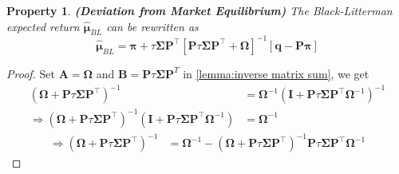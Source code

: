 \documentclass[13pt]{article}
\newtheorem{property}[theorem]{Property}
\theoremstyle{definition}
\theoremstyle{remark}
\begin{document}
\begin{property}\textbf{(Deviation from Market Equilibrium)}
    The Black-Litterman expected return $\bm{\hat{\bm{\mu}}}_{BL}$ can be rewritten as 
    \[
    \bm{\hat{\bm{\mu}}}_{BL}=\bm{\pi}+\tau \mathbf{\Sigma} \mathbf{P}^\top\left[\mathbf{P} \tau \mathbf{\Sigma} \mathbf{P}^\top+\mathbf{\Omega}\right]^{-1}[\bm{q}-\mathbf{P} \bm{\pi}]
    \]
\end{property}
\begin{proof}
Set $\mathbf{A}=\mathbf{\Omega}$ and $\mathbf{B}=\mathbf{P} \tau \mathbf{\Sigma} \mathbf{P}^T$ in \cref{lemma:inverse matrix sum}, we get
\begin{align*}
    (\mathbf{\Omega}+\mathbf{P}\tau \mathbf{\Sigma} \mathbf{P}^\top)^{-1} &= \mathbf{\Omega}^{-1}\left(\mathbf{\mathbf{I}}+\mathbf{P}\tau \mathbf{\Sigma} \mathbf{P}^\top \mathbf{\Omega}^{-1}\right)^{-1}\\
    \Longrightarrow (\mathbf{\Omega}+\mathbf{P}\tau \mathbf{\Sigma} \mathbf{P}^\top)^{-1}\left(\mathbf{\mathbf{I}}+\mathbf{P}\tau \mathbf{\Sigma} \mathbf{P}^\top \mathbf{\Omega}^{-1}\right) &= \mathbf{\Omega}^{-1}
    \end{align*}
    \begin{align}
    \Longrightarrow (\mathbf{\Omega}+\mathbf{P}\tau \mathbf{\Sigma} \mathbf{P}^\top)^{-1}&= \mathbf{\Omega}^{-1}-(\mathbf{\Omega}+\mathbf{P}\tau \mathbf{\Sigma} \mathbf{P}^\top)^{-1}\mathbf{P}\tau \mathbf{\Sigma} \mathbf{P}^\top \mathbf{\Omega}^{-1}\label{eq:eq 3}
\end{align}


\end{proof}
\end{document}
